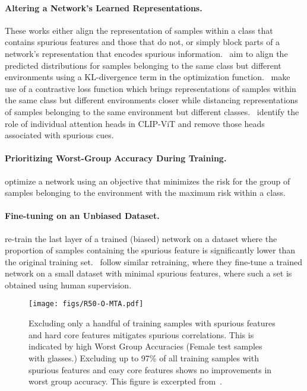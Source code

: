 \paragraph{Altering a Network's Learned Representations.   } These works either align the representation of samples within a class that contains spurious features and those that do not, or simply block parts of a network's representation that encodes spurious information.~\cite{Ahmed2021ICLR} aim to align the predicted distributions for samples belonging to the same class but different environments using a KL-divergence term in the optimization function.~\cite{Zhang2022ICML} make use of a contrastive loss function which brings representations of samples within the same class but different environments closer while distancing representations of samples belonging to the same environment but different classes.~\cite{gandelsman2024ICLR} identify the role of individual attention heads in CLIP-ViT and remove those heads associated with spurious cues.


\paragraph{Prioritizing Worst-Group Accuracy During Training.  } \cite{sagawa2020ICLR} optimize a network using an objective that minimizes the risk for the group of samples belonging to the environment with the maximum risk within a class.


\paragraph{Fine-tuning on an Unbiased Dataset. } \cite{Kirichenko2023ICLR} re-train the last layer of a trained (biased) network on a dataset where the proportion of samples containing the spurious feature is significantly lower than the original training set.~\cite{moayeri2023Neurips} follow similar retraining, where they fine-tune a trained network on a small dataset with minimal spurious features, where such a set is obtained using human supervision.


\begin{figure*}[t]
\centering     %
\texttt{[image: figs/R50-O-MTA.pdf]}
\caption{Excluding only a handful of training samples with spurious features and hard core features mitigates spurious correlations. This is indicated by high Worst Group Accuracies (Female test samples with glasses.) Excluding up to 97\% of all training samples with spurious features and easy core features shows no improvements in worst group accuracy. This figure is excerpted from~\protect\cite{Mulchandani2025ICLR}.}
\label{fig:keyplayers}
\end{figure*}


